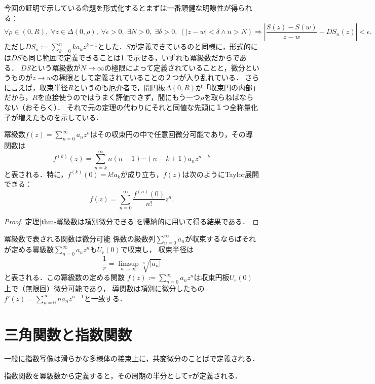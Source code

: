 \documentclass[uplatex, dvipdfmx]{jsreport}
\begin{document}
\begin{remark}
    今回の証明で示している命題を形式化するとまずは一番頑健な明瞭性が得られる：
    \[ \forall\rho\in(0,R),\;\forall z\in\Delta(0,\rho),\;\forall\epsilon>0,\;\exists N>0,\;\exists\delta>0,\ (|z-w|<\delta\land n>N)\Rightarrow\left|\frac{S(z)-S(w)}{z-w}-DS_n(z)\right|<\epsilon. \]
    ただし$DS_n:=\sum^n_{k=0}ka_kz^{k-1}$とした．$S$が定義できているのと同様に，形式的には$DS$も同じ範囲で定義できることは1.で示せる，いずれも冪級数だからである．
    $DS$という冪級数が$N\to\infty$の極限によって定義されていることと，微分というものが$z\to w$の極限として定義されていることの２つが入り乱れている．
    さらに言えば，収束半径$R$というのも厄介者で，開円板$\Delta(0,R)$が「収束円の内部」だから，$R$を直接使うのではうまく評価できず，間にもう一つ$\rho$を取らねばならない（おそらく）．
    それで元の定理の代わりにそれと同値な先頭に１つ全称量化子が増えたものを示している．
\end{remark}

\begin{theorem}[解析的な関数は正則である]\label{thm-analytic-functions-are-regular}
    冪級数$f(z)=\sum^\infty_{n=0}a_nz^n$はその収束円の中で任意回微分可能であり，その導関数は
    \[f^{(k)}(z)=\sum^\infty_{n=k}n(n-1)\cdots(n-k+1)a_nz^{n-k}\]
    と表される．特に，$f^{(k)}(0)=k!a_k$が成り立ち，$f(z)$は次のようにTaylor展開できる：
    \[ f(z)=\sum^\infty_{n=0}\frac{f^{(n)}(0)}{n!}z^n. \]
\end{theorem}
\begin{proof}
    定理\ref{thm-冪級数は項別微分できる}を帰納的に用いて得る結果である．
\end{proof}

\begin{itembox}[l]{冪級数で表される関数は微分可能}
    係数の級数列$\sum^\infty_{n=0}a_n$が収束するならばそれが定める冪級数$\sum^\infty_{n=0}a_nz^n$も$U_r(0)$で収束し，
    収束半径は
    \[ \frac{1}{r}=\limsup_{n\to\infty}\sqrt[n]{|a_n|} \]
    と表される．この冪級数の定める関数
    $f(z):=\sum^\infty_{n=0}a_nz^n$は収束円板$U_r(0)$上で（無限回）微分可能であり，
    導関数は項別に微分したもの
    $f'(z)=\sum^\infty_{n=0}na_nz^{n-1}$と一致する．
\end{itembox}

\section{三角関数と指数関数}

\begin{screen}
    一般に指数写像は滑らかな多様体の接束上に，共変微分のことばで定義される．

    指数関数を冪級数から定義すると，その周期の半分として$\pi$が定義される．
\end{screen}
\end{document}
